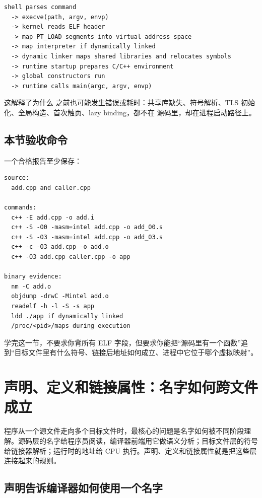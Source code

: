 \begin{lstlisting}[numbers=none,caption={启动时间线的压缩版}]
shell parses command
  -> execve(path, argv, envp)
  -> kernel reads ELF header
  -> map PT_LOAD segments into virtual address space
  -> map interpreter if dynamically linked
  -> dynamic linker maps shared libraries and relocates symbols
  -> runtime startup prepares C/C++ environment
  -> global constructors run
  -> runtime calls main(argc, argv, envp)
\end{lstlisting}

这解释了为什么  之前也可能发生错误或耗时：共享库缺失、符号解析、TLS 初始化、全局构造、首次触页、lazy binding，都不在  源码里，却在进程启动路径上。

\subsection{本节验收命令}
一个合格报告至少保存：

\begin{lstlisting}[numbers=none,caption={add\_i32 证据包}]
source:
  add.cpp and caller.cpp

commands:
  c++ -E add.cpp -o add.i
  c++ -S -O0 -masm=intel add.cpp -o add_O0.s
  c++ -S -O3 -masm=intel add.cpp -o add_O3.s
  c++ -c -O3 add.cpp -o add.o
  c++ -O3 add.cpp caller.cpp -o app

binary evidence:
  nm -C add.o
  objdump -drwC -Mintel add.o
  readelf -h -l -S -s app
  ldd ./app if dynamically linked
  /proc/<pid>/maps during execution
\end{lstlisting}

学完这一节，不要求你背所有 ELF 字段，但要求你能把“源码里有一个函数”追到“目标文件里有什么符号、链接后地址如何成立、进程中它位于哪个虚拟映射”。

\section{声明、定义和链接属性：名字如何跨文件成立}

程序从一个源文件走向多个目标文件时，最核心的问题是名字如何被不同阶段理解。源码层的名字给程序员阅读，编译器前端用它做语义分析；目标文件层的符号给链接器解析；运行时的地址给 CPU 执行。声明、定义和链接属性就是把这些层连接起来的规则。

\subsection{声明告诉编译器如何使用一个名字}

